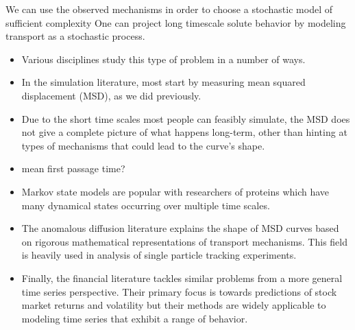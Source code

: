 \documentclass{article}
\begin{document}
  We can use the observed mechanisms in order to choose a stochastic model of
  sufficient complexity One can project long timescale solute behavior by modeling transport as a
  stochastic process.
  \begin{itemize}
  

    \item Various disciplines study this type of problem in a number of ways.
    \item In the simulation literature, most start by measuring mean squared 
    displacement (MSD), as we did previously.  %
    \item Due to the short time scales most people can feasibly simulate, the MSD 
    does not give a complete picture of what happens long-term, other than hinting
    at types of mechanisms that could lead to the curve's shape.
    \item mean first passage time?
    \item Markov state models are popular with researchers of proteins which have 
    many dynamical states occurring over multiple time scales.
    \item The anomalous diffusion literature explains the shape of MSD curves based
    on rigorous mathematical representations of transport mechanisms. This field is
    heavily used in analysis of single particle tracking experiments.
    \item Finally, the financial literature tackles similar problems from a more 
    general time series perspective. Their primary focus is towards predictions of
    stock market returns and volatility but their methods are widely applicable to
    modeling time series that exhibit a range of behavior.
  \end{itemize}
\end{document}
